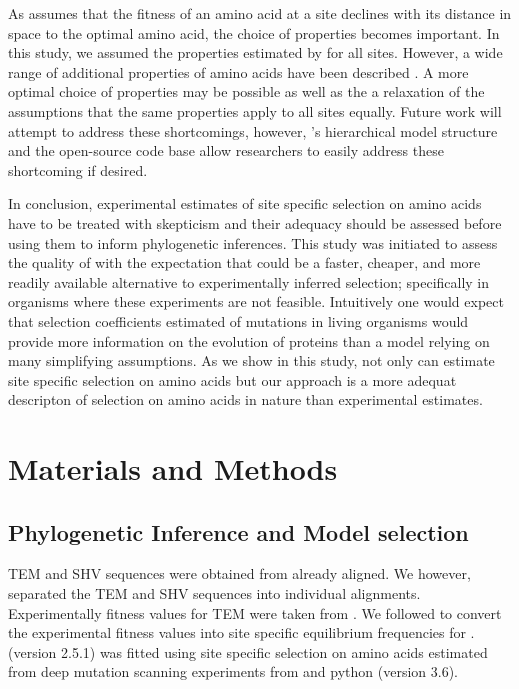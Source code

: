 
As \selac assumes that the fitness of an amino acid at a site declines with its distance in \PC space to the optimal amino acid, the choice of \PC properties becomes important.
In this study, we assumed the \PC properties estimated by \citet{grantham1974} for all sites.
However, a wide range of additional \PC properties of amino acids have been described \citep{Kawashima2008}.
A more optimal choice of \PC properties may be possible as well as the a relaxation of the assumptions that the same properties apply to all sites equally.
Future work will attempt to address these shortcomings, however, \selac's hierarchical model structure and the open-source code base allow researchers to easily address these shortcoming if desired.

In conclusion, experimental estimates of site specific selection on amino acids have to be treated with skepticism and their adequacy should be assessed before using them to inform phylogenetic inferences.
This study was initiated to assess the quality of \selac with the expectation that \selac could be a faster, cheaper, and more readily available alternative to experimentally inferred selection;
specifically in organisms where these experiments are not feasible.
Intuitively one would expect that selection coefficients estimated of mutations in living organisms would provide more information on the evolution of proteins than a model relying on many simplifying assumptions.
As we show in this study, not only can \selac estimate site specific selection on amino acids but our approach is a more adequat descripton of selection on amino acids in nature than experimental estimates.


\section{Materials and Methods}

\subsection{Phylogenetic Inference and Model selection}

TEM and SHV sequences were obtained from \citet{bloom2017} already aligned.
We however, separated the TEM and SHV sequences into individual alignments.
Experimentally fitness values for TEM were taken from \citet{stiffler2016}.
We followed \citep{bloom2017} to convert the experimental fitness values into site specific equilibrium frequencies for \phydms. 
\phydms (version 2.5.1) was fitted using site specific selection on amino acids estimated from deep mutation scanning experiments from \citet{stiffler2016} and python (version 3.6).

